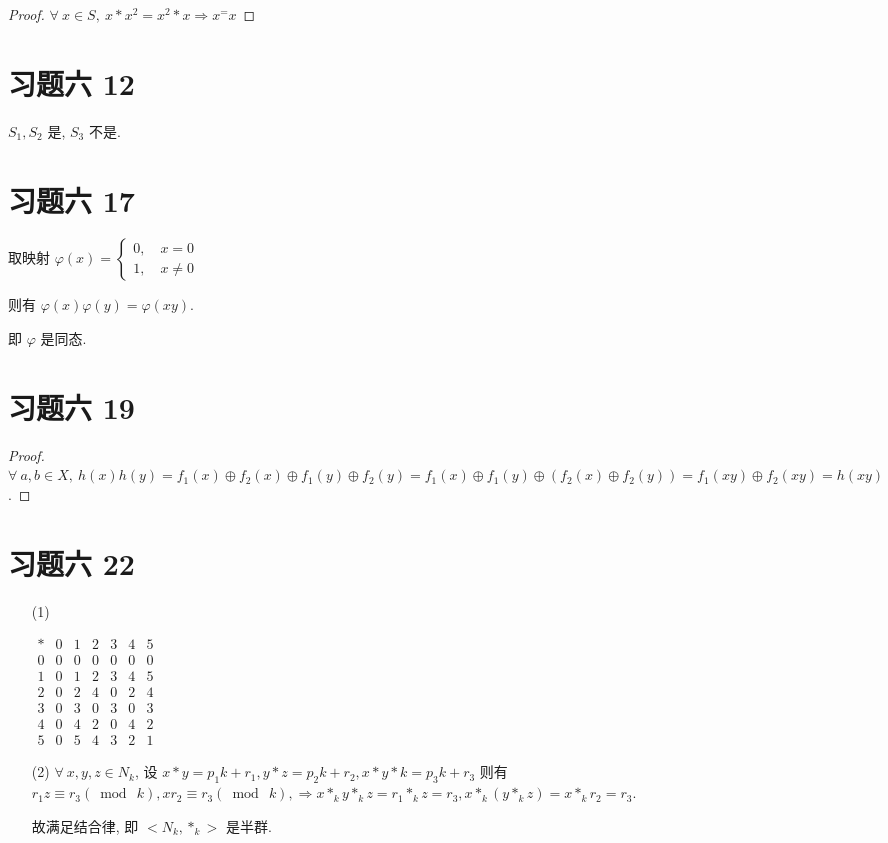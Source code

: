 \begin{proof}
	$\forall\ x\in S,\ x*x^2=x^2*x\Rightarrow x^=x$
\end{proof}

\section{习题六 12}

\begin{solution}
	$S_1,S_2$ 是, $S_3$ 不是.
\end{solution}

\section{习题六 17}

\begin{solution}
	取映射 $\varphi(x)=\left\{
	\begin{array}{l}
		0,\quad x=0\\
		1,\quad x\neq 0
	\end{array}
	\right.$
	
	则有 $\varphi(x)\varphi(y)=\varphi(xy)$.
	
	即 $\varphi$ 是同态.
\end{solution}

\section{习题六 19}

\begin{proof}
	$\forall\ a,b\in X,\ h(x)h(y)=f_1(x)\oplus f_2(x)\oplus f_1(y)\oplus f_2(y)=f_1(x)\oplus f_1(y)\oplus (f_2(x)\oplus f_2(y))=f_1(xy)\oplus f_2(xy)=h(xy)$.
\end{proof}

\section{习题六 22}

\begin{itemize}
	\item[(1)]
	
	$
	\begin{array}{c|cccccc}
		* & 0 & 1 & 2 & 3 & 4 & 5 \\\hline
		0 & 0 & 0 & 0 & 0 & 0 & 0 \\
		1 & 0 & 1 & 2 & 3 & 4 & 5 \\
		2 & 0 & 2 & 4 & 0 & 2 & 4 \\
		3 & 0 & 3 & 0 & 3 & 0 & 3 \\
		4 & 0 & 4 & 2 & 0 & 4 & 2 \\
		5 & 0 & 5 & 4 & 3 & 2 & 1 
	\end{array}
	$
	\item[(2)] $\forall\ x,y,z\in N_k$, 设 $x*y=p_1k+r_1,y*z=p_2k+r_2,x*y*k=p_3k+r_3$
	则有 $r_1z\equiv r_3(\bmod\ k),xr_2\equiv r_3(\bmod\ k),\Rightarrow x*_ky*_kz = r_1*_kz=r_3,x*_k(y*_kz)=x*_kr_2=r_3$.
	
	故满足结合律, 即 $<N_k,*_k>$ 是半群. 
	
\end{itemize}

